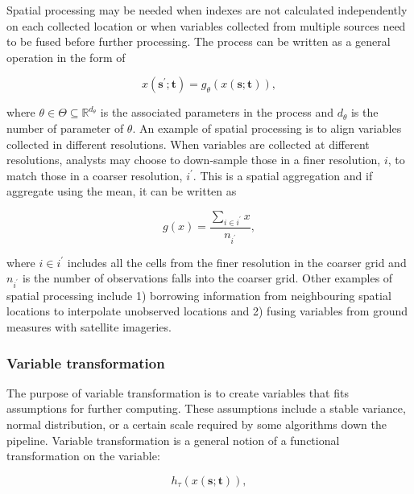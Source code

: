 \documentclass[
]{article}
\begin{document}
Spatial processing may be needed when indexes are not calculated
independently on each collected location or when variables collected
from multiple sources need to be fused before further processing. The
process can be written as a general operation in the form of

\begin{equation}
x(\mathbf{s}^\prime;\mathbf{t}) = g_{\mathcal{\theta}}(x(\mathbf{s};\mathbf{t})),
\end{equation}

where \(\theta \in \Theta \subseteq \mathbb{R}^{d_{\theta}}\) is the
associated parameters in the process and \(d_{\theta}\) is the number of
parameter of \(\theta\). An example of spatial processing is to align
variables collected in different resolutions. When variables are
collected at different resolutions, analysts may choose to down-sample
those in a finer resolution, \(i\), to match those in a coarser
resolution, \(i^\prime\). This is a spatial aggregation and if aggregate
using the mean, it can be written as

\begin{equation}
g(x) = \frac{\sum_{i \in i^\prime}x}{n_{i^\prime}},
\end{equation}

where \(i \in i^\prime\) includes all the cells from the finer
resolution in the coarser grid and \(n_{i^\prime}\) is the number of
observations falls into the coarser grid. Other examples of spatial
processing include 1) borrowing information from neighbouring spatial
locations to interpolate unobserved locations and 2) fusing variables
from ground measures with satellite imageries.

\hypertarget{variable-transformation}{%
\subsubsection{Variable transformation}\label{variable-transformation}}

The purpose of variable transformation is to create variables that fits
assumptions for further computing. These assumptions include a stable
variance, normal distribution, or a certain scale required by some
algorithms down the pipeline. Variable transformation is a general
notion of a functional transformation on the variable:

\begin{equation}
h_{\tau}(x(\mathbf{s};\mathbf{t})),
\end{equation}
\end{document}
